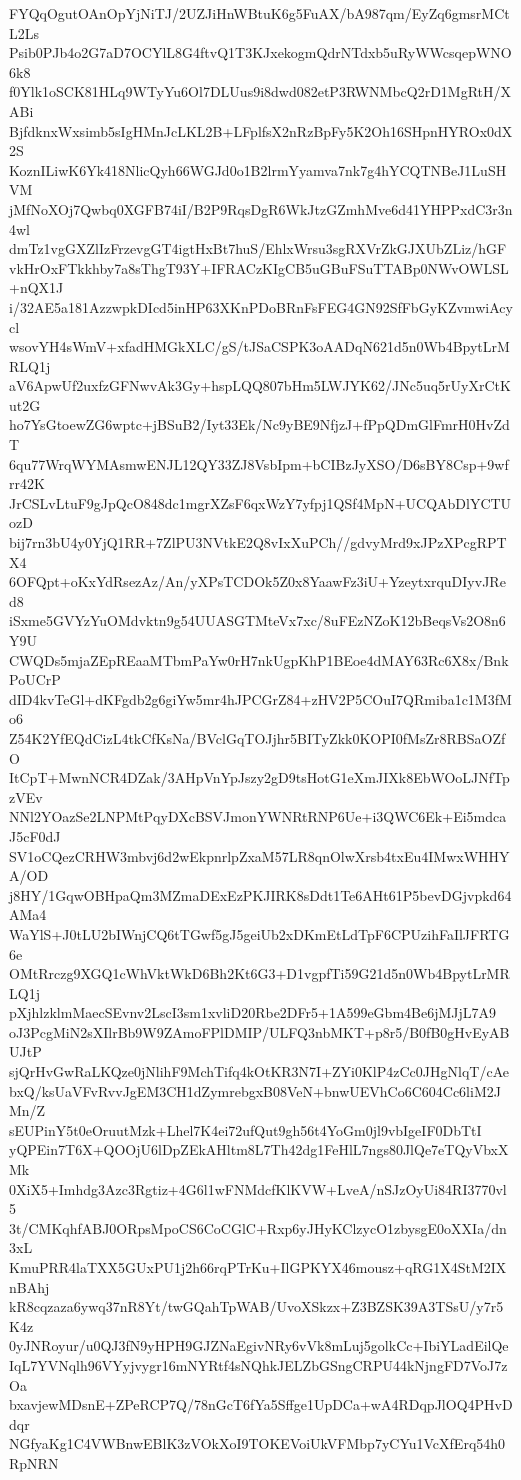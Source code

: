FYQqOgutOAnOpYjNiTJ/2UZJiHnWBtuK6g5FuAX/bA987qm/EyZq6gmsrMCtL2Ls
Psib0PJb4o2G7aD7OCYlL8G4ftvQ1T3KJxekogmQdrNTdxb5uRyWWcsqepWNO6k8
f0Ylk1oSCK81HLq9WTyYu6Ol7DLUus9i8dwd082etP3RWNMbcQ2rD1MgRtH/XABi
BjfdknxWxsimb5sIgHMnJcLKL2B+LFplfsX2nRzBpFy5K2Oh16SHpnHYROx0dX2S
KoznILiwK6Yk418NlicQyh66WGJd0o1B2lrmYyamva7nk7g4hYCQTNBeJ1LuSHVM
jMfNoXOj7Qwbq0XGFB74iI/B2P9RqsDgR6WkJtzGZmhMve6d41YHPPxdC3r3n4wl
dmTz1vgGXZlIzFrzevgGT4igtHxBt7huS/EhlxWrsu3sgRXVrZkGJXUbZLiz/hGF
vkHrOxFTkkhby7a8sThgT93Y+IFRACzKIgCB5uGBuFSuTTABp0NWvOWLSL+nQX1J
i/32AE5a181AzzwpkDIcd5inHP63XKnPDoBRnFsFEG4GN92SfFbGyKZvmwiAcycl
wsovYH4sWmV+xfadHMGkXLC/gS/tJSaCSPK3oAADqN621d5n0Wb4BpytLrMRLQ1j
aV6ApwUf2uxfzGFNwvAk3Gy+hspLQQ807bHm5LWJYK62/JNc5uq5rUyXrCtKut2G
ho7YsGtoewZG6wptc+jBSuB2/Iyt33Ek/Nc9yBE9NfjzJ+fPpQDmGlFmrH0HvZdT
6qu77WrqWYMAsmwENJL12QY33ZJ8VsbIpm+bCIBzJyXSO/D6sBY8Csp+9wfrr42K
JrCSLvLtuF9gJpQcO848dc1mgrXZsF6qxWzY7yfpj1QSf4MpN+UCQAbDlYCTUozD
bij7rn3bU4y0YjQ1RR+7ZlPU3NVtkE2Q8vIxXuPCh//gdvyMrd9xJPzXPcgRPTX4
6OFQpt+oKxYdRsezAz/An/yXPsTCDOk5Z0x8YaawFz3iU+YzeytxrquDIyvJRed8
iSxme5GVYzYuOMdvktn9g54UUASGTMteVx7xc/8uFEzNZoK12bBeqsVs2O8n6Y9U
CWQDs5mjaZEpREaaMTbmPaYw0rH7nkUgpKhP1BEoe4dMAY63Rc6X8x/BnkPoUCrP
dID4kvTeGl+dKFgdb2g6giYw5mr4hJPCGrZ84+zHV2P5COuI7QRmiba1c1M3fMo6
Z54K2YfEQdCizL4tkCfKsNa/BVclGqTOJjhr5BITyZkk0KOPI0fMsZr8RBSaOZfO
ItCpT+MwnNCR4DZak/3AHpVnYpJszy2gD9tsHotG1eXmJIXk8EbWOoLJNfTpzVEv
NNl2YOazSe2LNPMtPqyDXcBSVJmonYWNRtRNP6Ue+i3QWC6Ek+Ei5mdcaJ5cF0dJ
SV1oCQezCRHW3mbvj6d2wEkpnrlpZxaM57LR8qnOlwXrsb4txEu4IMwxWHHYA/OD
j8HY/1GqwOBHpaQm3MZmaDExEzPKJIRK8sDdt1Te6AHt61P5bevDGjvpkd64AMa4
WaYlS+J0tLU2bIWnjCQ6tTGwf5gJ5geiUb2xDKmEtLdTpF6CPUzihFaIlJFRTG6e
OMtRrczg9XGQ1cWhVktWkD6Bh2Kt6G3+D1vgpfTi59G21d5n0Wb4BpytLrMRLQ1j
pXjhlzklmMaecSEvnv2LscI3sm1xvliD20Rbe2DFr5+1A599eGbm4Be6jMJjL7A9
oJ3PcgMiN2sXIlrBb9W9ZAmoFPlDMIP/ULFQ3nbMKT+p8r5/B0fB0gHvEyABUJtP
sjQrHvGwRaLKQze0jNlihF9MchTifq4kOtKR3N7I+ZYi0KlP4zCc0JHgNlqT/cAe
bxQ/ksUaVFvRvvJgEM3CH1dZymrebgxB08VeN+bnwUEVhCo6C604Cc6liM2JMn/Z
sEUPinY5t0eOruutMzk+Lhel7K4ei72ufQut9gh56t4YoGm0jl9vbIgeIF0DbTtI
yQPEin7T6X+QOOjU6lDpZEkAHltm8L7Th42dg1FeHlL7ngs80JlQe7eTQyVbxXMk
0XiX5+Imhdg3Azc3Rgtiz+4G6l1wFNMdcfKlKVW+LveA/nSJzOyUi84RI3770vl5
3t/CMKqhfABJ0ORpsMpoCS6CoCGlC+Rxp6yJHyKClzycO1zbysgE0oXXIa/dn3xL
KmuPRR4laTXX5GUxPU1j2h66rqPTrKu+IlGPKYX46mousz+qRG1X4StM2IXnBAhj
kR8cqzaza6ywq37nR8Yt/twGQahTpWAB/UvoXSkzx+Z3BZSK39A3TSsU/y7r5K4z
0yJNRoyur/u0QJ3fN9yHPH9GJZNaEgivNRy6vVk8mLuj5golkCc+IbiYLadEilQe
IqL7YVNqlh96VYyjvygr16mNYRtf4sNQhkJELZbGSngCRPU44kNjngFD7VoJ7zOa
bxavjewMDsnE+ZPeRCP7Q/78nGcT6fYa5Sffge1UpDCa+wA4RDqpJlOQ4PHvDdqr
NGfyaKg1C4VWBnwEBlK3zVOkXoI9TOKEVoiUkVFMbp7yCYu1VcXfErq54h0RpNRN
